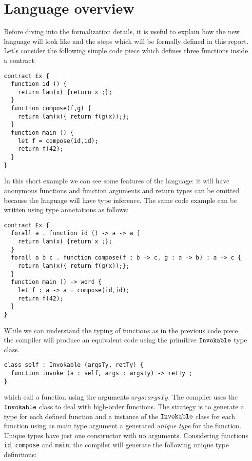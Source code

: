\documentclass[a4paper, 11pt]{article}
\theoremstyle{definition}
\begin{document}
\section{Language overview} 

Before diving into the formalization details, it 
is useful to explain how the new language will look like 
and the steps which will be formally defined in this 
report. Let's consider the following simple code 
piece which defines three functions inside a contract:

\begin{lstlisting}[language=solidity]
contract Ex {
  function id () {
    return lam(x) {return x ;};
  }
  function compose(f,g) {
    return lam(x){ return f(g(x));};
  }
  function main () {
    let f = compose(id,id);
    return f(42);
  }
}
\end{lstlisting}

In this short example we can see some features of the \solidity 
language: it will have anonymous functions and 
function arguments and return types can be omitted because 
the language will have type inference. The same code 
example can be written using type annotations as follows:

\begin{lstlisting}[language=solidity]
contract Ex {
  forall a . function id () -> a -> a {
    return lam(x) {return x ;};
  }
  forall a b c . function compose(f : b -> c, g : a -> b) : a -> c {
    return lam(x){ return f(g(x));};
  }
  function main () -> word {
    let f : a -> a = compose(id,id);
    return f(42);
  }
}
\end{lstlisting}

While we can understand the typing of functions as in the previous
code piece, the \solidity compiler will produce an equivalent 
code using the primitive $\mathtt{Invokable}$ type class. 

\begin{lstlisting}[language=solidity]
class self : Invokable (argsTy, retTy) {
  function invoke (a : self, args : argsTy) -> retTy ;
}
\end{lstlisting}
which call a function using the arguments $args : argsTy$. The compiler 
uses the $\mathtt{Invokable}$ class to deal with high-order functions. The 
strategy is to generate a type for each defined function and a 
instance of the $\mathtt{Invokable}$ class for each function using as main 
type argument a generated \emph{unique type} for the function. 
Unique types have just one constructor with no arguments. Considering 
functions \texttt{id}, \texttt{compose} and \texttt{main}; the compiler 
will generate the following unique type definitions:
\end{document}
